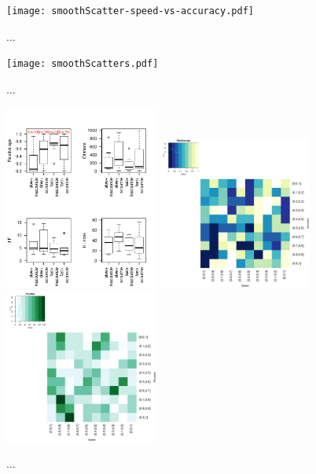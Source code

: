 \documentclass[fleqn,10pt]{SelfArx} %
\begin{document}
\begin{figure}[H]
\centering
\texttt{[image: smoothScatter-speed-vs-accuracy.pdf]}
\caption{...}
\label{fig:S2}
\end{figure}

\begin{figure}[H]
\centering
\texttt{[image: smoothScatters.pdf]}
\caption{...}
\label{fig:S3}
\end{figure}



\begin{figure}[H]
\centering
\includegraphics[width=0.45\textwidth]{relAge-speedAcc.pdf}
\includegraphics[width=0.45\textwidth]{relAge-SpeedVsAccuracy-heatmap.pdf}\\
\includegraphics[width=0.45\textwidth]{hindex-SpeedVsAccuracy-heatmap.pdf}
\caption{...}
\label{fig:S4}
\end{figure}
\end{document}
